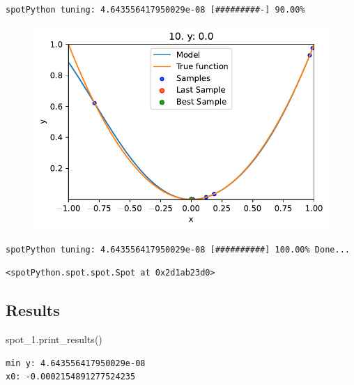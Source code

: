 \documentclass[
  letterpaper,
  DIV=11,
  numbers=noendperiod]{scrreprt}
\newenvironment{Shaded}{\begin{snugshade}}{\end{snugshade}}
\newcommand{\NormalTok}[1]{\textcolor[rgb]{0.00,0.23,0.31}{#1}}
\begin{document}
\begin{verbatim}
spotPython tuning: 4.643556417950029e-08 [#########-] 90.00% 
\end{verbatim}

\begin{figure}[H]

{\centering \includegraphics{010_num_spot_sklearn_surrogate_files/figure-pdf/cell-21-output-14.pdf}

}

\end{figure}

\begin{verbatim}
spotPython tuning: 4.643556417950029e-08 [##########] 100.00% Done...
\end{verbatim}

\begin{verbatim}
<spotPython.spot.spot.Spot at 0x2d1ab23d0>
\end{verbatim}

\hypertarget{results-2}{%
\subsection{Results}\label{results-2}}

\begin{Shaded}
\begin{Highlighting}[]
\NormalTok{spot\_1.print\_results()}
\end{Highlighting}
\end{Shaded}

\begin{verbatim}
min y: 4.643556417950029e-08
x0: -0.0002154891277524235
\end{verbatim}
\end{document}
